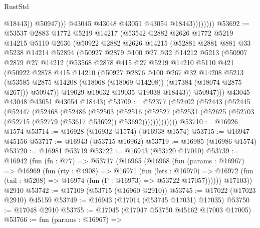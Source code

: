 \begin{lexlean}{RustStd}
\begin{coremodule}
                              @18443))
                          @50947)))
                    @43045
                    @43048
                    @43051
                    @43054
                    @18443))))))))
@53692 := @53537
    @2883
    @1772
    @5219
    @14217
    (@53542
      @2882
      @2626
      @1772
      @5219
      @14215
      @5110
      @2636
      (@50922
        @2882
        @2626
        @14215
        (@52881
          @2881
          @881
          @33
          @5238
          @14214
          @52894
          (@50927
            @2879
            @100
            @27
            @32
            @14212
            @5213
            (@50907
              @2879
              @27
              @14212
              (@53568
                @2878
                @415
                @27
                @5219
                @14210
                @5110
                @421
                (@50922
                  @2878
                  @415
                  @14210
                  (@50927
                    @2876
                    @100
                    @267
                    @32
                    @14208
                    @5213
                    (@53585 @2875 @14208 (@18068 (@18069 @14208)) (@17384 (@18074 @2875 @267)))
                    @50947))
                @19029
                @19032
                @19035
                @19038
                @18443))
            @50947)))
      @43045
      @43048
      @43051
      @43054
      @18443)
@53709 := @52377
    (@52402
      (@52443
        (@52445
          (@52447
            (@52468
              (@52486
                (@52503
                  (@52516
                    (@52527
                      (@52531 (@52625 (@52703 (@52715 (@52779 (@53617 @53692)) @53692)))))))))))))
@53710 := @16926 @1574
@53714 := @16928 (@16932 @1574) (@16938 @1574)
@53715 := @16947 @45156
@53717 := @16943 (@53715 @16962)
@53719 := @16985 (@16986 @1574)
@53720 := @16981 @53719
@53722 := @16943 (@53720 @17010)
@53739 := @16942
    (fun (fn : @77) =>
    @53717
      (@16965
        (@16968
          (fun (params : @16967) =>
          @16969
            (fun (rty : @4908) =>
            @16971
              (fun (lets : @16970) =>
              @16972 (fun (tail : @5208) => @16974 (fun (Γ : @16973) => @53722 @17057))))))
        @17103))
    @2910
@53742 := @17109 (@53715 (@16960 @2910))
@53745 := @17022 (@17023 @2910) @45159
@53749 := @16943 (@17014 (@53745 @17031) @17035)
@53750 := @17048 @2910
@53755 := @17045 (@17047 @53750 @45162 @17003 @17005)
@53766 := fun (params : @16967) =>

\end{coremodule}
\end{lexlean}
